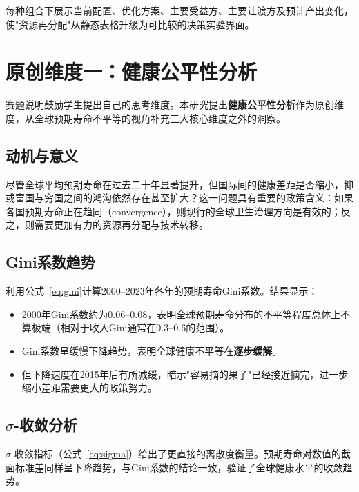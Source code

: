 \documentclass[12pt,a4paper]{ctexart}
\begin{document}
每种组合下展示当前配置、优化方案、主要受益方、主要让渡方及预计产出变化，使"资源再分配"从静态表格升级为可比较的决策实验界面。

\section{原创维度一：健康公平性分析}

赛题说明鼓励学生提出自己的思考维度。本研究提出\textbf{健康公平性分析}作为原创维度，从全球预期寿命不平等的视角补充三大核心维度之外的洞察。

\subsection{动机与意义}

尽管全球平均预期寿命在过去二十年显著提升，但国际间的健康差距是否缩小，抑或富国与穷国之间的鸿沟依然存在甚至扩大？这一问题具有重要的政策含义：如果各国预期寿命正在趋同（convergence），则现行的全球卫生治理方向是有效的；反之，则需要更加有力的资源再分配与技术转移。

\subsection{Gini系数趋势}

利用公式~\eqref{eq:gini}计算2000--2023年各年的预期寿命Gini系数。结果显示：

\begin{itemize}[leftmargin=1.5em]
    \item 2000年Gini系数约为0.06--0.08，表明全球预期寿命分布的不平等程度总体上不算极端（相对于收入Gini通常在0.3--0.6的范围）。
    \item Gini系数呈缓慢下降趋势，表明全球健康不平等在\textbf{逐步缓解}。
    \item 但下降速度在2015年后有所减缓，暗示"容易摘的果子"已经接近摘完，进一步缩小差距需要更大的政策努力。
\end{itemize}

\subsection{$\sigma$-收敛分析}

$\sigma$-收敛指标（公式~\eqref{eq:sigma}）给出了更直接的离散度衡量。预期寿命对数值的截面标准差同样呈下降趋势，与Gini系数的结论一致，验证了全球健康水平的收敛趋势。
\end{document}
